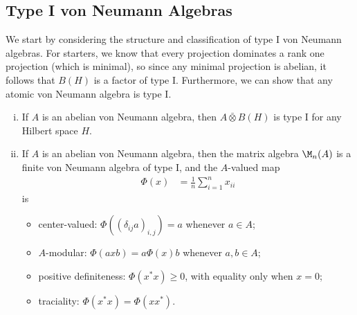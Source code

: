\documentclass[10pt]{mypackage}
\begin{document}
\subsection{Type I von Neumann Algebras}%
We start by considering the structure and classification of type I von Neumann algebras. For starters, we know that every projection dominates a rank one projection (which is minimal), so since any minimal projection is abelian, it follows that $B(H)$ is a factor of type I. Furthermore, we can show that any atomic von Neumann algebra is type I.
\begin{proposition}\hfill
  \begin{enumerate}[(i)]
    \item If $A$ is an abelian von Neumann algebra, then $A\bar\otimes B(H)$ is type I for any Hilbert space $H$.
    \item If $A$ is an abelian von Neumann algebra, then the matrix algebra $\M_n(A)$ is a finite von Neumann algebra of type I, and the $A$-valued map
      \begin{align*}
        \Phi(x) &= \frac{1}{n}\sum_{i=1}^{n}x_{ii}
      \end{align*}
      is
      \begin{itemize}
        \item center-valued: $\Phi\left( \left( \delta_{ij}a \right)_{i,j} \right) = a$ whenever $a\in A$;
        \item $A$-modular: $\Phi\left( axb \right) = a\Phi(x)b$ whenever $a,b\in A$;
        \item positive definiteness: $\Phi\left( x^{\ast}x \right)\geq 0$, with equality only when $x = 0$;
        \item traciality: $\Phi\left( x^{\ast}x \right) = \Phi\left( xx^{\ast} \right)$.
      \end{itemize}
  \end{enumerate}
\end{proposition}
\end{document}
